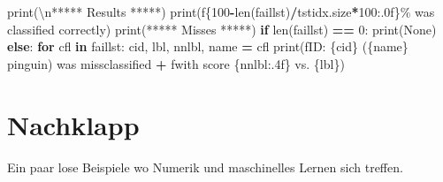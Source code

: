 \documentclass[
]{book}
\newenvironment{Shaded}{\begin{snugshade}}{\end{snugshade}}
\newcommand{\BuiltInTok}[1]{#1}
\newcommand{\CharTok}[1]{\textcolor[rgb]{0.31,0.60,0.02}{#1}}
\newcommand{\ControlFlowTok}[1]{\textcolor[rgb]{0.13,0.29,0.53}{\textbf{#1}}}
\newcommand{\DecValTok}[1]{\textcolor[rgb]{0.00,0.00,0.81}{#1}}
\newcommand{\KeywordTok}[1]{\textcolor[rgb]{0.13,0.29,0.53}{\textbf{#1}}}
\newcommand{\NormalTok}[1]{#1}
\newcommand{\OperatorTok}[1]{\textcolor[rgb]{0.81,0.36,0.00}{\textbf{#1}}}
\newcommand{\SpecialCharTok}[1]{\textcolor[rgb]{0.00,0.00,0.00}{#1}}
\newcommand{\SpecialStringTok}[1]{\textcolor[rgb]{0.31,0.60,0.02}{#1}}
\newcommand{\StringTok}[1]{\textcolor[rgb]{0.31,0.60,0.02}{#1}}
\theoremstyle{definition}
\theoremstyle{definition}
\theoremstyle{definition}
\theoremstyle{definition}
\theoremstyle{remark}
\begin{document}
\begin{Shaded}
\begin{Highlighting}[]
\BuiltInTok{print}\NormalTok{(}\StringTok{\textquotesingle{}}\CharTok{\textbackslash{}n}\StringTok{***** Results *****\textquotesingle{}}\NormalTok{)}
\BuiltInTok{print}\NormalTok{(}\SpecialStringTok{f\textquotesingle{}}\SpecialCharTok{\{}\DecValTok{100}\OperatorTok{{-}}\BuiltInTok{len}\NormalTok{(faillst)}\OperatorTok{/}\NormalTok{tstidx}\SpecialCharTok{.}\NormalTok{size}\OperatorTok{*}\DecValTok{100}\SpecialCharTok{:.0f\}}\SpecialStringTok{\% was classified correctly\textquotesingle{}}\NormalTok{)}
\BuiltInTok{print}\NormalTok{(}\StringTok{\textquotesingle{}***** Misses *****\textquotesingle{}}\NormalTok{)}
\ControlFlowTok{if} \BuiltInTok{len}\NormalTok{(faillst) }\OperatorTok{==} \DecValTok{0}\NormalTok{:}
    \BuiltInTok{print}\NormalTok{(}\StringTok{\textquotesingle{}None\textquotesingle{}}\NormalTok{)}
\ControlFlowTok{else}\NormalTok{:}
    \ControlFlowTok{for}\NormalTok{ cfl }\KeywordTok{in}\NormalTok{ faillst:}
\NormalTok{        cid, lbl, nnlbl, name }\OperatorTok{=}\NormalTok{ cfl}
        \BuiltInTok{print}\NormalTok{(}\SpecialStringTok{f\textquotesingle{}ID: }\SpecialCharTok{\{}\NormalTok{cid}\SpecialCharTok{\}}\SpecialStringTok{ (}\SpecialCharTok{\{}\NormalTok{name}\SpecialCharTok{\}}\SpecialStringTok{ pinguin) was missclassified \textquotesingle{}} \OperatorTok{+}
              \SpecialStringTok{f\textquotesingle{}with score }\SpecialCharTok{\{}\NormalTok{nnlbl}\SpecialCharTok{:.4f\}}\SpecialStringTok{ vs. }\SpecialCharTok{\{}\NormalTok{lbl}\SpecialCharTok{\}}\SpecialStringTok{\textquotesingle{}}\NormalTok{)}
\end{Highlighting}
\end{Shaded}

\hypertarget{nachklapp}{%
\chapter{Nachklapp}\label{nachklapp}}

Ein paar lose Beispiele wo Numerik und maschinelles Lernen sich treffen.
\end{document}

